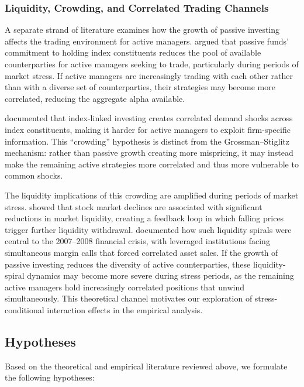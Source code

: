 \documentclass[11pt, a4paper]{article}
\begin{document}
\subsubsection{Liquidity, Crowding, and Correlated Trading Channels}

A separate strand of literature examines how the growth of passive investing affects the trading environment for active managers. \textcite{sushko2018} argued that passive funds' commitment to holding index constituents reduces the pool of available counterparties for active managers seeking to trade, particularly during periods of market stress. If active managers are increasingly trading with each other rather than with a diverse set of counterparties, their strategies may become more correlated, reducing the aggregate alpha available.

\textcite{coles2022} documented that index-linked investing creates correlated demand shocks across index constituents, making it harder for active managers to exploit firm-specific information. This ``crowding'' hypothesis is distinct from the Grossman--Stiglitz mechanism: rather than passive growth creating more mispricing, it may instead make the remaining active strategies more correlated and thus more vulnerable to common shocks.

The liquidity implications of this crowding are amplified during periods of market stress. \textcite{hameed2010} showed that stock market declines are associated with significant reductions in market liquidity, creating a feedback loop in which falling prices trigger further liquidity withdrawal. \textcite{brunnermeier2009} documented how such liquidity spirals were central to the 2007--2008 financial crisis, with leveraged institutions facing simultaneous margin calls that forced correlated asset sales. If the growth of passive investing reduces the diversity of active counterparties, these liquidity-spiral dynamics may become more severe during stress periods, as the remaining active managers hold increasingly correlated positions that unwind simultaneously. This theoretical channel motivates our exploration of stress-conditional interaction effects in the empirical analysis.

\subsection{Hypotheses}

Based on the theoretical and empirical literature reviewed above, we formulate the following hypotheses:
\end{document}
